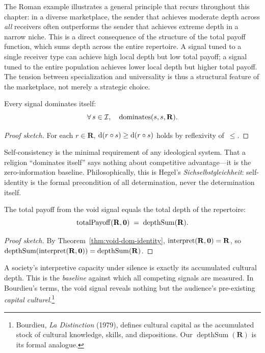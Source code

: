 The Roman example illustrates a general principle that recurs throughout
this chapter: in a diverse marketplace, the sender that achieves moderate
depth across \emph{all} receivers often outperforms the sender that achieves
extreme depth in a narrow niche.  This is a direct consequence of the
structure of the total payoff function, which sums depth across the entire
repertoire.  A signal tuned to a single receiver type can achieve high
local depth but low total payoff; a signal tuned to the entire population
achieves lower local depth but higher total payoff.  The tension between
specialization and universality is thus a structural feature of the
marketplace, not merely a strategic choice.

\begin{theorem}
\label{thm:self-dom}
Every signal dominates itself:
\[
  \forall\, s \in \mathcal{I},\quad \operatorname{dominates}(s, s, \mathbf{R}).
\]
\end{theorem}

\begin{proof}[Proof sketch]
For each $r \in \mathbf{R}$, $\operatorname{d}(r \circ s) \ge \operatorname{d}(r \circ s)$
holds by reflexivity of~$\le$.
\end{proof}

Self-consistency is the minimal requirement of any ideological system.
That a religion ``dominates itself'' says nothing about competitive
advantage---it is the zero-information baseline.  Philosophically, this is
Hegel's \emph{Sichselbstgleichheit}: self-identity is the formal precondition
of all determination, never the determination itself.

\begin{theorem}
\label{thm:void-payoff}
The total payoff from the void signal equals the total depth of the repertoire:
\[
  \operatorname{totalPayoff}(\mathbf{R}, \mathbf{0}) \;=\; \operatorname{depthSum}(\mathbf{R}).
\]
\end{theorem}

\begin{proof}[Proof sketch]
By Theorem~\ref{thm:void-dom-identity},
$\operatorname{interpret}(\mathbf{R}, \mathbf{0}) = \mathbf{R}$, so
$\operatorname{depthSum}(\operatorname{interpret}(\mathbf{R}, \mathbf{0}))
= \operatorname{depthSum}(\mathbf{R})$.
\end{proof}

A society's interpretive capacity under silence is exactly its accumulated
cultural depth.  This is the \emph{baseline} against which all competing
signals are measured.  In Bourdieu's terms, the void signal reveals nothing
but the audience's pre-existing \emph{capital culturel}.\footnote{Bourdieu,
\textit{La Distinction} (1979), defines cultural capital as the accumulated
stock of cultural knowledge, skills, and dispositions.  Our
$\operatorname{depthSum}(\mathbf{R})$ is its formal analogue.}

